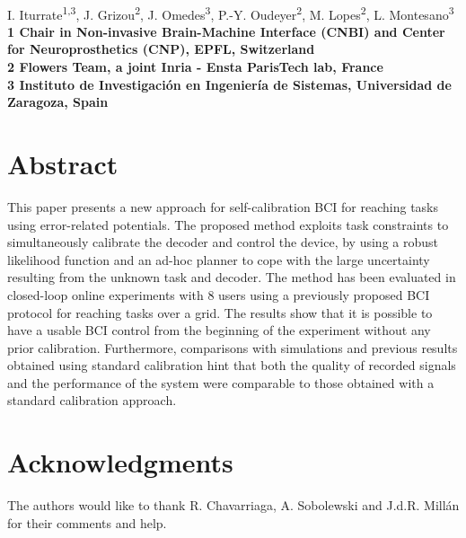\documentclass[10pt,letterpaper]{article}
\date{}
\begin{document}
\vspace*{0.35in}


\begin{flushleft}
{\Large
\textbf{}
}
\newline
\\
I. Iturrate\textsuperscript{1,3}, J. Grizou\textsuperscript{2}, J. Omedes\textsuperscript{3}, P.-Y. Oudeyer\textsuperscript{2}, M. Lopes\textsuperscript{2}, L. Montesano\textsuperscript{3}
\\
\bf{1} Chair in Non-invasive Brain-Machine Interface (CNBI) and Center for Neuroprosthetics (CNP), EPFL, Switzerland
\\
\bf{2} Flowers Team, a joint Inria - Ensta ParisTech lab, France
\\
\bf{3} Instituto de Investigaci\'{o}n en Ingenier\'{i}a de Sistemas, Universidad de Zaragoza, Spain
\\

\end{flushleft}

\section*{Abstract}
This paper presents a new approach for self-calibration BCI for reaching tasks using error-related potentials. The proposed method exploits task constraints to simultaneously calibrate the decoder and control the device, by using a robust likelihood function and an ad-hoc planner to cope with the large uncertainty resulting from the unknown task and decoder. The method has been evaluated in closed-loop online experiments with 8 users using a previously proposed BCI protocol for reaching tasks over a grid. The results show that it is possible to have a usable BCI control from the beginning of the experiment without any prior calibration. Furthermore, comparisons with simulations and previous results obtained using standard calibration hint that both the quality of recorded signals and the performance of the system were comparable to those obtained with a standard calibration approach.



\linenumbers



%







%

\section*{Acknowledgments}
The authors would like to thank R. Chavarriaga, A. Sobolewski and J.d.R. Mill\'{a}n for their comments and help.
\end{document}
